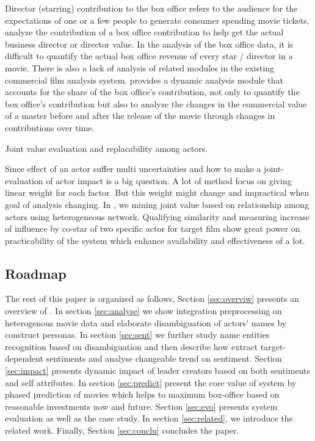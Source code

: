 \par Director (starring) contribution to the box office refers to the audience for the expectations of one or a few people to generate consumer spending movie tickets, analyze the contribution of a box office contribution to help get the actual business director or director value. In the analysis of the box office data, it is difficult to quantify the actual box office revenue of every star / director in a movie. There is also a lack of analysis of related modules in the existing commercial film analysis system.
\system provides a dynamic analysis module that accounts for the share of the box office's contribution, not only to quantify the box office's contribution but also to analyze the changes in the commercial value of a master before and after the release of the movie through changes in contributions over time.
\begin{difficulties} Joint value evaluation and replacability among actors.\end{difficulties}
\par Since effect of an actor suffer multi uncertainties and how to make a joint-evaluation of actor impact is a big question. A lot of method focus on giving linear weight for each factor. But this weight might change and impractical when goal of analysis changing. In \system, we mining joint value based on relationship among actors using heterogeneous network. Qualifying similarity and measuring increase of influence by co-star of two specific actor for target film show great power on practicability of the system which enhance availability and effectiveness of \system a lot.

\subsection{Roadmap}
The rest of this paper is organized as follows, Section \ref{sec:overviw} presents an overview of \system. In section \ref{sec:analyse} we show integration preprocessing on heterogenous movie data and elaborate disambiguation of actors' names by construct personas. In section \ref{sec:sent} we further study name entities recognition based on disambiguation and then describe how \system extract target-dependent sentiments and analyse changeable trend on sentiment. Section \ref{sec:impact} presents dynamic impact of leader creators based on both sentiments and self attributes. In section \ref{sec:predict} present the core value of system by phased prediction of movies which helps to maximum box-office based on reasonable investments now and future. Section \ref{sec:evo} presents system evaluation as well as the case study. In section \ref{sec:related}, we introduce the related work. Finally, Section \ref{sec:conclu} concludes the paper. 